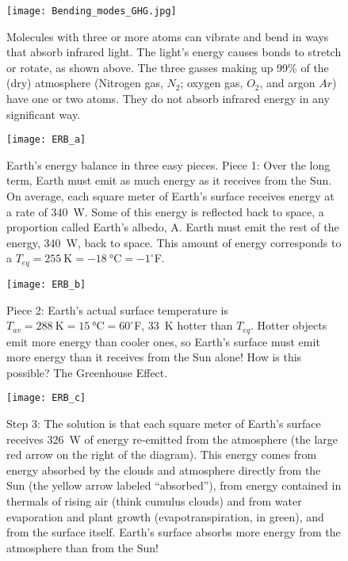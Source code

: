 \begin{figure}[p]
\centering
\texttt{[image: Bending\_modes\_GHG.jpg]}%
\caption{Molecules with three or more atoms can vibrate and bend in ways that absorb infrared light. The light's energy causes bonds to stretch or rotate, as shown above. The three gasses making up 99\% of the (dry) atmosphere (Nitrogen gas, $N_2$; oxygen gas, $O_2$, and argon $Ar$) have one or two atoms. They do not absorb infrared energy in any significant way.}   
\label{fig:bending_modes}
\end{figure}

\begin{figure}[p]
\centering
\texttt{[image: ERB\_a]}%
\caption{Earth's energy balance in three easy pieces. Piece 1: Over the long term, Earth must emit as much energy as it receives from the Sun. On average, each square meter of Earth's surface receives energy at a rate of \SI{340}{\watt}. Some of this energy is reflected back to space, a proportion called Earth's albedo, A. Earth must emit the rest of the energy, \SI{340}{\watt}, back to space. This amount of energy corresponds to a $T_{eq} = \SI{255}{\kelvin}=\SI{-18}{\celsius}=-1^{\circ}$F.}   
\label{fig:erb_a}
\end{figure}

\begin{figure}[p]
\centering
\texttt{[image: ERB\_b]}%
\caption{Piece 2: Earth's actual surface temperature is $T_{av} = \SI{288}{\kelvin}=\SI{15}{\celsius}=60^{\circ}$F, \SI{33}{\kelvin} hotter than $T_{eq}$. Hotter objects emit more energy than cooler ones, so Earth's surface must emit more energy than it receives from the Sun alone! How is this possible? The Greenhouse Effect.}   
\label{fig:erb_b}
\end{figure}

\begin{figure}[p]
\centering
\texttt{[image: ERB\_c]}%
\caption{Step 3: The solution is that each square meter of Earth's surface receives \SI{326}{\watt} of energy re-emitted from the atmosphere (the large red arrow on the right of the diagram). This energy comes from energy absorbed by the clouds and atmosphere directly from the Sun (the yellow arrow labeled ``absorbed''), from energy contained in thermals of rising air (think cumulus clouds) and from water evaporation and plant growth (evapotranspiration, in green), and from the surface itself. Earth's surface absorbs more energy from the atmosphere than from the Sun!}   
\label{fig:erb_c}
\end{figure}


